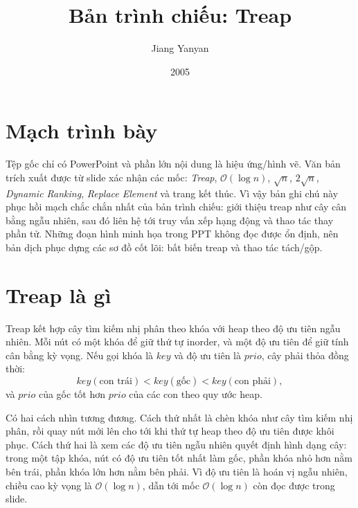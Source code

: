 \documentclass[11pt]{article}
\title{Bản trình chiếu: Treap}
\author{Jiang Yanyan}
\date{2005}
\newcommand{\Oh}{\mathcal{O}}
\begin{document}
\maketitle


\section{Mạch trình bày}

Tệp gốc chỉ có PowerPoint và phần lớn nội dung là hiệu ứng/hình vẽ. Văn bản
trích xuất được từ slide xác nhận các mốc: \textit{Treap},
\(\Oh(\log n)\), \(\sqrt n\), \(2\sqrt n\), \textit{Dynamic Ranking},
\textit{Replace Element} và trang kết thúc. Vì vậy bản ghi chú này phục hồi
mạch chắc chắn nhất của bản trình chiếu: giới thiệu treap như cây cân bằng
ngẫu nhiên, sau đó liên hệ tới truy vấn xếp hạng động và thao tác thay phần
tử. Những đoạn hình minh họa trong PPT không đọc được ổn định, nên bản dịch
phục dựng các sơ đồ cốt lõi: bất biến treap và thao tác tách/gộp.

\section{Treap là gì}

Treap kết hợp cây tìm kiếm nhị phân theo khóa với heap theo độ ưu tiên ngẫu
nhiên. Mỗi nút có một khóa để giữ thứ tự inorder, và một độ ưu tiên để giữ
tính cân bằng kỳ vọng. Nếu gọi khóa là \(key\) và độ ưu tiên là \(prio\), cây
phải thỏa đồng thời:
\[
  key(\text{con trái}) < key(\text{gốc}) < key(\text{con phải}),
\]
và \(prio\) của gốc tốt hơn \(prio\) của các con theo quy ước heap.

Có hai cách nhìn tương đương. Cách thứ nhất là chèn khóa như cây tìm kiếm nhị
phân, rồi quay nút mới lên cho tới khi thứ tự heap theo độ ưu tiên được khôi
phục. Cách thứ hai là xem các độ ưu tiên ngẫu nhiên quyết định hình dạng cây:
trong một tập khóa, nút có độ ưu tiên tốt nhất làm gốc, phần khóa nhỏ hơn nằm
bên trái, phần khóa lớn hơn nằm bên phải. Vì độ ưu tiên là hoán vị ngẫu
nhiên, chiều cao kỳ vọng là \(\Oh(\log n)\), dẫn tới mốc \(\Oh(\log n)\) còn
đọc được trong slide.
\end{document}

